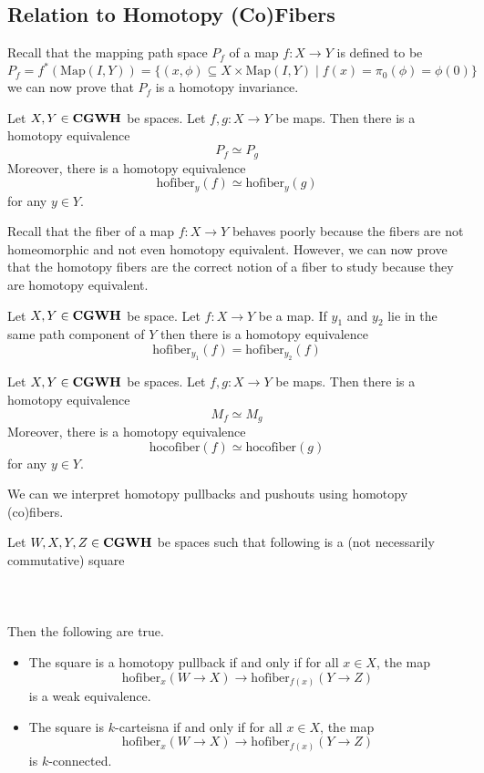 \documentclass[a4paper]{article}
\begin{document}
\subsection{Relation to Homotopy (Co)Fibers}
Recall that the mapping path space $P_f$ of a map $f:X\to Y$ is defined to be $$P_f=f^\ast(\text{Map}(I,Y))=\{(x,\phi)\subseteq X\times\text{Map}(I,Y)\;|\;f(x)=\pi_0(\phi)=\phi(0)\}$$ we can now prove that $P_f$ is a homotopy invariance. 

\begin{crl}{}{} Let $X,Y\in\bold{CGWH}$ be spaces. Let $f,g:X\to Y$ be maps. Then there is a homotopy equivalence $$P_f\simeq P_g$$ Moreover, there is a homotopy equivalence $$\text{hofiber}_y(f)\simeq\text{hofiber}_y(g)$$ for any $y\in Y$. 
\end{crl}

Recall that the fiber of a map $f:X\to Y$ behaves poorly because the fibers are not homeomorphic and not even homotopy equivalent. However, we can now prove that the homotopy fibers are the correct notion of a fiber to study because they are homotopy equivalent. 

\begin{crl}{}{} Let $X,Y\in\bold{CGWH}$ be space. Let $f:X\to Y$ be a map. If $y_1$ and $y_2$ lie in the same path component of $Y$ then there is a homotopy equivalence $$\text{hofiber}_{y_1}(f)=\text{hofiber}_{y_2}(f)$$
\end{crl}

\begin{crl}{}{} Let $X,Y\in\bold{CGWH}$ be spaces. Let $f,g:X\to Y$ be maps. Then there is a homotopy equivalence $$M_f\simeq M_g$$ Moreover, there is a homotopy equivalence $$\text{hocofiber}(f)\simeq\text{hocofiber}(g)$$ for any $y\in Y$. 
\end{crl}

We can we interpret homotopy pullbacks and pushouts using homotopy (co)fibers. 

\begin{prp}{}{} Let $W,X,Y,Z\in\bold{CGWH}$ be spaces such that following is a (not necessarily commutative) square \\~\\
\\~\\
Then the following are true. 
\begin{itemize}
\item The square is a homotopy pullback if and only if for all $x\in X$, the map $$\text{hofiber}_x(W\to X)\to\text{hofiber}_{f(x)}(Y\to Z)$$ is a weak equivalence. 
\item The square is $k$-carteisna if and only if for all $x\in X$, the map $$\text{hofiber}_x(W\to X)\to\text{hofiber}_{f(x)}(Y\to Z)$$ is $k$-connected. 
\end{itemize}
\end{prp}
\end{document}
